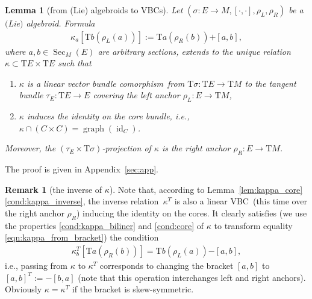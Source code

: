\documentclass[pdftex]{sigma}
\newcommand{\ZM}{{VBC}} %
\newcommand{\Zakrzewski}{{vector bundle comorphism}}
\newcommand{\graf}{\operatorname{graph}}
\newcommand{\Sec}{\operatorname{Sec}}
\newcommand{\id}{\operatorname{id}}
\newcommand{\ra}{\rightarrow}
\newcommand{\plus}{\boldsymbol{\pmb{+}}}
\newcommand{\minus}{\boldsymbol{\pmb{-}}}
\newcommand{\rhoL}{\rho_L} %
\newcommand{\rhoR}{\rho_R}
\newcommand{\T}{\mathrm{T}} %
\numberwithin{equation}{section}
\newtheorem{lem}[thm]{Lemma}
\theoremstyle{definition}
\newtheorem{rem}[thm]{Remark}
\begin{document}
\begin{lem}[from (Lie) algebroids to \ZM s]\label{lem:kappa_from_sigma} Let $(\sigma\colon E\ra M,[\cdot,\cdot], \rhoL,\rhoR)$ be a $($Lie$)$ algebroid. Formula
\begin{gather}\label{eqn:kappa_from_bracket}
\kappa_a\left[\T b(\rhoL(a))\right]:=\T a(\rhoR(b))\plus [a,b],
\end{gather}
where $a,b\in \Sec_M(E)$ are arbitrary sections, extends to the unique relation $\kappa\subset\T E\times \T E$ such that
\begin{enumerate}[$(i)$]\itemsep=0pt
	\item\label{cond:kappa_biliner} $\kappa$ is a linear \Zakrzewski\ from $\T\sigma\colon \T E\ra \T M$ to the tangent bundle $\tau_E\colon \T E\ra E$ covering the left anchor $\rhoL\colon E\ra \T M$,
	\item\label{cond:core} $\kappa$ induces the identity on the core bundle, i.e., $\kappa\cap(C\times C)=\graf(\id_C)$.
\end{enumerate}
Moreover, the $(\tau_E\times \T\sigma)$-projection of $\kappa$ is the right anchor $\rhoR\colon E\ra \T M$.
\end{lem}
 The proof is given in Appendix~\ref{sec:app}.

\begin{rem}[the inverse of $\kappa$]\label{rem:kappa_T} Note that, according to Lemma~\ref{lem:kappa_core}\eqref{cond:kappa_inverse}, the inverse relation~$\kappa^T$ is also a linear
\ZM\ (this time over the right anchor $\rhoR$) inducing the identity on the cores.
It clearly satisfies (we use the properties \eqref{cond:kappa_biliner} and \eqref{cond:core} of $\kappa$ to transform equality \eqref{eqn:kappa_from_bracket}) the condition
\begin{gather*} \kappa_b^T\left[\T a(\rhoR(b))\right]=\T b(\rhoL(a))\minus [a,b],\end{gather*}
i.e., passing from $\kappa$ to $\kappa^T$ corresponds to changing the bracket $[a,b]$ to $[a,b]^T:=-[b,a]$ (note that this operation interchanges left and right anchors). Obviously $\kappa=\kappa^T$ if the bracket is skew-symmetric.
\end{rem}
\end{document}
